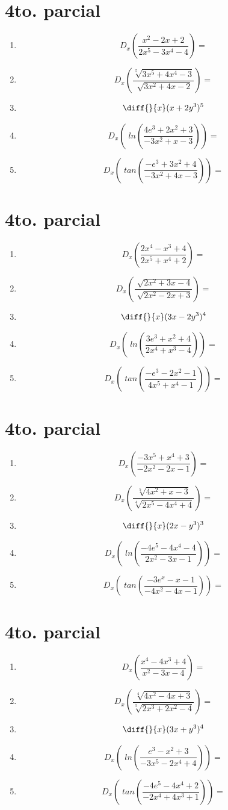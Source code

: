 \documentclass[oneside,spanish,letter]{article}
\begin{document}
\section{4to. parcial}
\begin{enumerate}
 \item $$ D_x \left( \frac{x^2-2x+2}{2x^5-3x^4-4}\right)=$$
 \item $$ D_x \left( \frac{\sqrt[5]{3x^5+4x^4-3}}{\sqrt[]{3x^2+4x-2}}\right)=$$
\item $$\diff{}{x}(x+2y^3)^5$$
 \item $$ D_x \left(\;ln\left( \frac{4e^3+2x^2+3}{-3x^2+x-3}\right)\right)=$$
 \item $$ D_x \left(\;tan\left( \frac{-e^3+3x^2+4}{-3x^2+4x-3}\right)\right)=$$
 \end{enumerate}
  \newpage
\section{4to. parcial}
\begin{enumerate}
 \item $$ D_x \left( \frac{2x^4-x^3+4}{2x^5+x^4+2}\right)=$$
 \item $$ D_x \left( \frac{\sqrt[]{2x^2+3x-4}}{\sqrt[]{2x^2-2x+3}}\right)=$$
\item $$\diff{}{x}(3x-2y^3)^4$$
 \item $$ D_x \left(\;ln\left( \frac{3e^3+x^2+4}{2x^4+x^3-4}\right)\right)=$$
 \item $$ D_x \left(\;tan\left( \frac{-e^3-2x^2-1}{4x^5+x^4-1}\right)\right)=$$
 \end{enumerate}
  \newpage
\section{4to. parcial}
\begin{enumerate}
 \item $$ D_x \left( \frac{-3x^5+x^4+3}{-2x^2-2x-1}\right)=$$
 \item $$ D_x \left( \frac{\sqrt[5]{4x^2+x-3}}{\sqrt[4]{2x^5-4x^4+4}}\right)=$$
\item $$\diff{}{x}(2x-y^3)^3$$
 \item $$ D_x \left(\;ln\left( \frac{-4e^5-4x^4-4}{2x^2-3x-1}\right)\right)=$$
 \item $$ D_x \left(\;tan\left( \frac{-3e^x-x-1}{-4x^2-4x-1}\right)\right)=$$
 \end{enumerate}
  \newpage
\section{4to. parcial}
\begin{enumerate}
 \item $$ D_x \left( \frac{x^4-4x^3+4}{x^2-3x-4}\right)=$$
 \item $$ D_x \left( \frac{\sqrt[4]{4x^2-4x+3}}{\sqrt[5]{2x^3+2x^2-4}}\right)=$$
\item $$\diff{}{x}(3x+y^3)^4$$
 \item $$ D_x \left(\;ln\left( \frac{e^3-x^2+3}{-3x^5-2x^4+4}\right)\right)=$$
 \item $$ D_x \left(\;tan\left( \frac{-4e^5-4x^4+2}{-2x^4+4x^3+1}\right)\right)=$$
 \end{enumerate}
  \newpage
\end{document}
